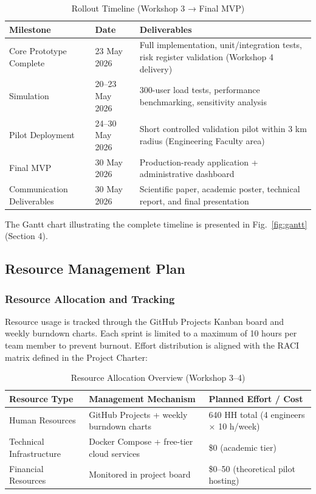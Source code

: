 \documentclass[9pt,conference]{IEEEtran}
\begin{document}
\begin{table}[h]
\centering
\small
\caption{Rollout Timeline (Workshop 3 → Final MVP)}
\label{tab:rollout-timeline}
\begin{tabular}{@{}p{1.8cm}p{2.8cm}p{3.5cm}@{}}
\toprule
\textbf{Milestone} & \textbf{Date} & \textbf{Deliverables} \\
\midrule
Core Prototype Complete & 23 May 2026 & Full implementation, unit/integration tests, risk register validation (Workshop 4 delivery) \\
Simulation & 20--23 May 2026 & 300-user load tests, performance benchmarking, sensitivity analysis \\
Pilot Deployment & 24--30 May 2026 & Short controlled validation pilot within 3 km radius (Engineering Faculty area) \\
Final MVP & 30 May 2026 & Production-ready application + administrative dashboard \\
Communication Deliverables & 30 May 2026 & Scientific paper, academic poster, technical report, and final presentation \\
\bottomrule
\end{tabular}
\end{table}

The Gantt chart illustrating the complete timeline is presented in Fig.~\ref{fig:gantt} (Section 4).


\subsection{Resource Management Plan}

\subsubsection{Resource Allocation and Tracking}

Resource usage is tracked through the GitHub Projects Kanban board and weekly burndown charts. Each sprint is limited to a maximum of 10 hours per team member to prevent burnout. Effort distribution is aligned with the RACI matrix defined in the Project Charter:

\begin{table}[h]
\centering
\small
\caption{Resource Allocation Overview (Workshop 3–4)}
\label{tab:resource-allocation}
\begin{tabular}{@{}p{1.8cm}p{2.8cm}p{3.5cm}@{}}
\toprule
\textbf{Resource Type} & \textbf{Management Mechanism} & \textbf{Planned Effort / Cost} \\
\midrule
Human Resources & GitHub Projects + weekly burndown charts & 640 HH total (4 engineers × 10 h/week) \\
Technical Infrastructure & Docker Compose + free-tier cloud services & \$0 (academic tier) \\
Financial Resources & Monitored in project board & \$0--50 (theoretical pilot hosting) \\
\bottomrule
\end{tabular}
\end{table}
\end{document}
